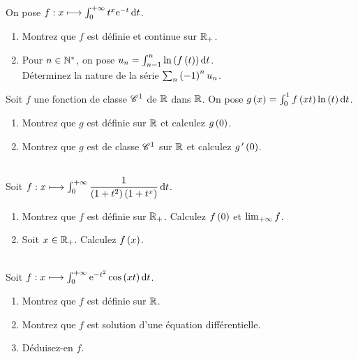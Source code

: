 \begin{exo}~\\
On pose \(f:x\mapsto\int_0^{\pinf}t^x\e{-t}\odif{t}\).

\begin{enumerate}
    \item Montrez que \(f\) est définie et continue sur \(\mathbb{R}_+\). \\
    \item Pour \(n\in\mathbb{N}^*\), on pose \(u_n=\int_{n-1}^n\ln\paren{f\paren{t}}\odif{t}\). \\ Déterminez la nature de la série \(\sum_n\left(-1\right)^nu_n\).
\end{enumerate}
\end{exo}

\begin{exo}
Soit \(f\) une fonction de classe \(\mathscr{C}^{1}\) de \(\mathbb{R}\) dans \(\mathbb{R}\). On pose \(g\paren{x}=\int_0^1f\paren{xt}\ln\paren{t}\odif{t}\).

\begin{enumerate}
    \item Montrez que \(g\) est définie sur \(\mathbb{R}\) et calculez \(g\left(0\right)\). \\
    \item Montrez que \(g\) est de classe \(\mathscr{C}^{1}\) sur \(\mathbb{R}\) et calculez \(g^{\,\prime}\left(0\right)\).
\end{enumerate}
\end{exo}

\begin{exo}~\\
Soit \(f:x\mapsto\int_0^{\pinf}\dfrac{1}{\paren{1+t^2}\paren{1+t^x}}\odif{t}\).

\begin{enumerate}
    \item Montrez que \(f\) est définie sur \(\mathbb{R}_+\). Calculez \(f\left(0\right)\) et \(\lim_{+\infty}f\). \\
    \item Soit \(x\in\mathbb{R}_+\). Calculez \(f\left(x\right)\).
\end{enumerate}
\end{exo}

\begin{exo}~\\
Soit \(f:x\mapsto\int_0^{\pinf}\e{-t^2}\cos\paren{xt}\odif{t}\).

\begin{enumerate}
    \item Montrez que \(f\) est définie sur \(\mathbb{R}\). \\
    \item Montrez que \(f\) est solution d'une équation différentielle. \\
    \item Déduisez-en \(f\).
\end{enumerate}
\end{exo}

